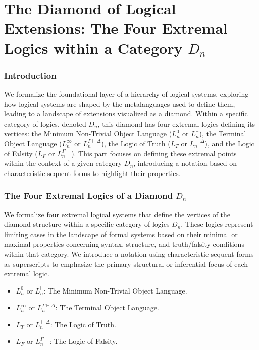 \documentclass{article}
\newcommand{\LT}{L_T} %
\newcommand{\LF}{L_F} %
\begin{document}
																	\part{The Diamond of Logical Extensions: The Four Extremal Logics within a Category $D_n$} %
																	
																	\section{Introduction}
																	
																	We formalize the foundational layer of a hierarchy of logical systems, exploring how logical systems are shaped by the metalanguages used to define them, leading to a landscape of extensions visualized as a diamond. Within a specific category of logics, denoted $D_n$, this diamond has four extremal logics defining its vertices: the Minimum Non-Trivial Object Language ($L^0_n$ or $L^{\vdash}_n$), the Terminal Object Language ($L^\infty_n$ or $L^{\Gamma\vdash\Delta}_n$), the Logic of Truth ($\LT$ or $L^{\vdash\Delta}_n$), and the Logic of Falsity ($\LF$ or $L^{\Gamma\vdash}_n$). This part focuses on defining these extremal points within the context of a given category $D_n$, introducing a notation based on characteristic sequent forms to highlight their properties.
																	
																	\section{The Four Extremal Logics of a Diamond $D_n$}
																	
																	We formalize four extremal logical systems that define the vertices of the diamond structure within a specific category of logics $D_n$. These logics represent limiting cases in the landscape of formal systems based on their minimal or maximal properties concerning syntax, structure, and truth/falsity conditions within that category. We introduce a notation using characteristic sequent forms as superscripts to emphasize the primary structural or inferential focus of each extremal logic.
																	
																	\begin{itemize}
																		\item $L^0_n$ or $L^{\vdash}_n$: The Minimum Non-Trivial Object Language.
																		\item $L^\infty_n$ or $L^{\Gamma\vdash\Delta}_n$: The Terminal Object Language.
																		\item $\LT$ or $L^{\vdash\Delta}_n$: The Logic of Truth.
																		\item $\LF$ or $L^{\Gamma\vdash}_n$: The Logic of Falsity.
																	\end{itemize}
																	
\end{document}
